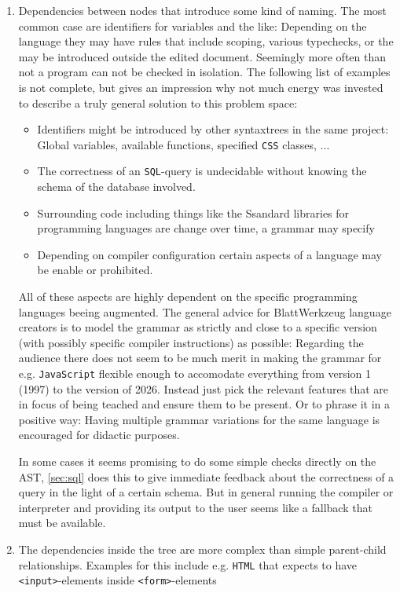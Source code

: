 \documentclass[]{report}
\begin{document}
\begin{enumerate}
\item Dependencies between nodes that introduce some kind of naming. The most common case are identifiers for variables and the like: Depending on the language they may have rules that include scoping, various typechecks, or the may be introduced outside the edited document. Seemingly more often than not a program can not be checked in isolation. The following list of examples is not complete, but gives an impression why not much energy was invested to describe a truly general solution to this problem space:

  \begin{itemize}
  \item Identifiers might be introduced by other syntaxtrees in the same project: Global variables, available functions, specified \texttt{CSS} classes, ...
  \item The correctness of an \texttt{SQL}-query is undecidable without knowing the schema of the database involved.
  \item Surrounding code including things like the Ssandard libraries for programming languages are change over time, a grammar may specify
  \item Depending on compiler configuration certain aspects of a language may be enable or prohibited.
  \end{itemize}

  All of these aspects are highly dependent on the specific programming languages beeing augmented. The general advice for Blatt\-Werkzeug language creators is to model the grammar as strictly and close to a specific version (with possibly specific compiler instructions) as possible: Regarding the audience there does not seem to be much merit in making the grammar for e.g. \texttt{JavaScript} flexible enough to accomodate everything from version 1 (1997) to the version of 2026. Instead just pick the relevant features that are in focus of being teached and ensure them to be present. Or to phrase it in a positive way: Having multiple grammar variations for the same language is encouraged for didactic purposes.

  In some cases it seems promising to do some simple checks directly on the AST, \cref{sec:sql} does this to give immediate feedback about the correctness of a query in the light of a certain schema. But in general running the compiler or interpreter and providing its output to the user seems like a fallback that must be available.
\item The dependencies inside the tree are more complex than simple parent-child relationships. Examples for this include e.g. \texttt{HTML} that expects to have \texttt{<input>}-elements inside \texttt{<form>}-elements
\end{enumerate}
\end{document}
